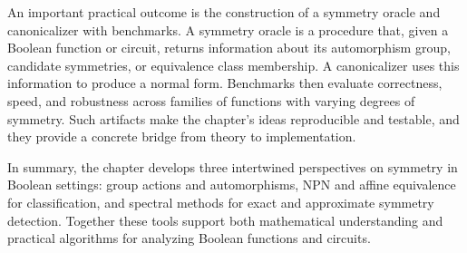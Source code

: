 \documentclass[11pt]{article}
\begin{document}
An important practical outcome is the construction of a symmetry oracle and canonicalizer with benchmarks. A symmetry oracle is a procedure that, given a Boolean function or circuit, returns information about its automorphism group, candidate symmetries, or equivalence class membership. A canonicalizer uses this information to produce a normal form. Benchmarks then evaluate correctness, speed, and robustness across families of functions with varying degrees of symmetry. Such artifacts make the chapter's ideas reproducible and testable, and they provide a concrete bridge from theory to implementation.

In summary, the chapter develops three intertwined perspectives on symmetry in Boolean settings: group actions and automorphisms, NPN and affine equivalence for classification, and spectral methods for exact and approximate symmetry detection. Together these tools support both mathematical understanding and practical algorithms for analyzing Boolean functions and circuits.
\end{document}

